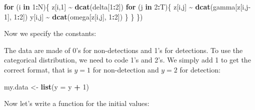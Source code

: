 \documentclass[
  12pt,
]{krantz}
\newenvironment{Shaded}{\begin{snugshade}}{\end{snugshade}}
\newcommand{\AttributeTok}[1]{\textcolor[rgb]{0.13,0.29,0.53}{#1}}
\newcommand{\ControlFlowTok}[1]{\textcolor[rgb]{0.13,0.29,0.53}{\textbf{#1}}}
\newcommand{\DecValTok}[1]{\textcolor[rgb]{0.00,0.00,0.81}{#1}}
\newcommand{\DocumentationTok}[1]{\textcolor[rgb]{0.56,0.35,0.01}{\textbf{\textit{#1}}}}
\newcommand{\FunctionTok}[1]{\textcolor[rgb]{0.13,0.29,0.53}{\textbf{#1}}}
\newcommand{\NormalTok}[1]{#1}
\newcommand{\OtherTok}[1]{\textcolor[rgb]{0.56,0.35,0.01}{#1}}
\newcommand{\SpecialCharTok}[1]{\textcolor[rgb]{0.81,0.36,0.00}{\textbf{#1}}}
\begin{document}
\begin{Shaded}
\begin{Highlighting}[]
  \ControlFlowTok{for}\NormalTok{ (i }\ControlFlowTok{in} \DecValTok{1}\SpecialCharTok{:}\NormalTok{N)\{}
\NormalTok{    z[i,}\DecValTok{1}\NormalTok{] }\SpecialCharTok{\textasciitilde{}} \FunctionTok{dcat}\NormalTok{(delta[}\DecValTok{1}\SpecialCharTok{:}\DecValTok{2}\NormalTok{])}
    \ControlFlowTok{for}\NormalTok{ (j }\ControlFlowTok{in} \DecValTok{2}\SpecialCharTok{:}\NormalTok{T)\{}
\NormalTok{      z[i,j] }\SpecialCharTok{\textasciitilde{}} \FunctionTok{dcat}\NormalTok{(gamma[z[i,j}\DecValTok{{-}1}\NormalTok{], }\DecValTok{1}\SpecialCharTok{:}\DecValTok{2}\NormalTok{])}
\NormalTok{      y[i,j] }\SpecialCharTok{\textasciitilde{}} \FunctionTok{dcat}\NormalTok{(omega[z[i,j], }\DecValTok{1}\SpecialCharTok{:}\DecValTok{2}\NormalTok{])}
\NormalTok{    \}}
\NormalTok{  \}}
\NormalTok{\})}
\end{Highlighting}
\end{Shaded}

Now we specify the constants:

\begin{Shaded}
\end{Shaded}

The data are made of 0's for non-detections and 1's for detections. To use the categorical distribution, we need to code 1's and 2's. We simply add 1 to get the correct format, that is \(y = 1\) for non-detection and \(y = 2\) for detection:

\begin{Shaded}
\begin{Highlighting}[]
\NormalTok{my.data }\OtherTok{\textless{}{-}} \FunctionTok{list}\NormalTok{(}\AttributeTok{y =}\NormalTok{ y }\SpecialCharTok{+} \DecValTok{1}\NormalTok{)}
\end{Highlighting}
\end{Shaded}

Now let's write a function for the initial values:
\end{document}
